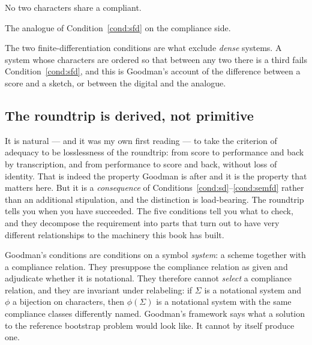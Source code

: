\begin{condition}
\label{cond:semd}
No two characters share a compliant.
\end{condition}

\begin{condition}
\label{cond:semfd}
The analogue of Condition~\ref{cond:sfd} on the compliance side.
\end{condition}

\noindent
The two finite-differentiation conditions are what exclude
\emph{dense} systems.
A system whose characters are ordered so that between any two there
is a third fails Condition~\ref{cond:sfd}, and this is Goodman's
account of the difference between a score and a sketch, or between
the digital and the analogue.

\subsection{The roundtrip is derived, not primitive}
\label{sec:roundtrip}

It is natural --- and it was my own first reading --- to take the
criterion of adequacy to be losslessness of the roundtrip: from
score to performance and back by transcription, and from
performance to score and back, without loss of identity.
That is indeed the property Goodman is after and it is the property
that matters here.
But it is a \emph{consequence} of
Conditions~\ref{cond:sd}--\ref{cond:semfd} rather than an
additional stipulation, and the distinction is load-bearing.
The roundtrip tells you when you have succeeded.
The five conditions tell you what to check, and they decompose the
requirement into parts that turn out to have very different
relationships to the machinery this book has built.

\begin{remark}
\label{rem:invariance}
Goodman's conditions are conditions on a symbol \emph{system}: a
scheme together with a compliance relation.
They presuppose the compliance relation as given and adjudicate
whether it is notational.
They therefore cannot \emph{select} a compliance relation, and they
are invariant under relabeling: if $\Sigma$ is a notational system
and $\phi$ a bijection on characters, then $\phi(\Sigma)$ is a
notational system with the same compliance classes differently
named.
Goodman's framework says what a solution to the reference bootstrap
problem would look like.
It cannot by itself produce one.
\end{remark}

